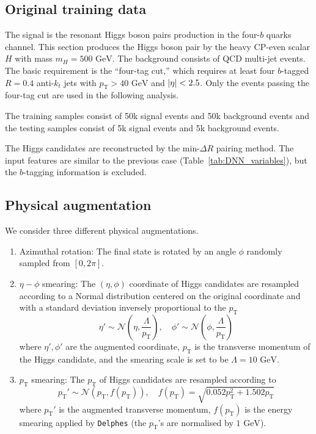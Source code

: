 \documentclass[12pt]{article}
\begin{document}
	\subsection{Original training data}%
	\label{sub:original_training_data}
		The signal is the resonant Higgs boson pairs production in the four-$b$ quarks channel. This section produces the Higgs boson pair by the heavy CP-even scalar $H$ with mass $m_H = \text{500 GeV}$. The background consists of QCD multi-jet events. The basic requirement is the ``four-tag cut,'' which requires at least four $b$-tagged $R = 0.4$ anti-$k_t$ jets with $p_\text{T} > \text{40 GeV}$ and $\abs{\eta} < 2.5$. Only the events passing the four-tag cut are used in the following analysis.
		
		The training samples consist of 50k signal events and 50k background events and the testing samples consist of 5k signal events and 5k background events.

		The Higgs candidates are reconstructed by the $\text{min-}\Delta R$ pairing method. The input features are similar to the previous case (Table~\ref{tab:DNN_variables}), but the $b$-tagging information is excluded.
	\subsection{Physical augmentation}%
	\label{sub:physical_augmentation}
		We consider three different physical augmentations.

		\begin{enumerate}
			\item Azimuthal rotation: The final state is rotated by an angle $\phi$ randomly sampled from $[0, 2\pi]$.
			\item $\eta-\phi$ smearing: The $\left( \eta,\phi \right) $ coordinate of Higgs candidates are resampled according to a Normal distribution centered on the original coordinate and with a standard deviation inversely proportional to the $p_{\text{T}}$
				\begin{equation}
					\eta' \sim \mathcal{N}\left(\eta, \frac{\Lambda}{p_{\text{T}}}\right), \quad \phi' \sim \mathcal{N}\left(\phi, \frac{\Lambda}{p_{\text{T}}}\right)
				\end{equation}
				where $\eta', \phi'$ are the augmented coordinate, $p_{\text{T}}$ is the transverse momentum of the Higgs candidate, and the smearing scale is set to be $\Lambda = \text{10 GeV}$.
			\item $p_\text{T}$ smearing: The $p_{\text{T}}$ of Higgs candidates are resampled according to
				\begin{equation}
					p_{\text{T}}' \sim \mathcal{N}\left( p_{\text{T}}, f(p_{\text{T}}) \right), \quad f(p_{\text{T}}) = \sqrt{0.052 p_{\text{T}}^2 + 1.502p_{\text{T}}}
				\end{equation}
				where $p_{\text{T}}'$ is the augmented transverse momentum, $f\left( p_\text{T} \right) $ is the energy smearing applied by \verb|Delphes| (the $p_{\text{T}}$'s are normalised by $\text{1 GeV}$).
		\end{enumerate}
\end{document}
